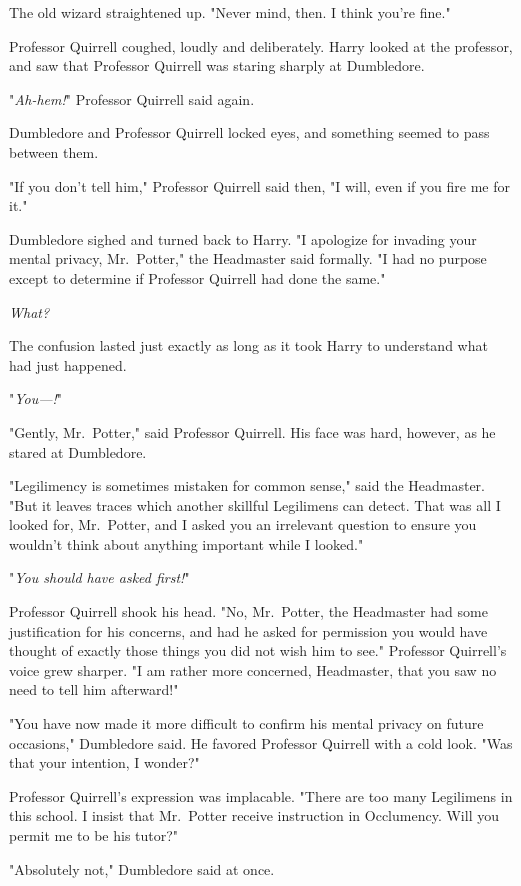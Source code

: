 The old wizard straightened up. "Never mind, then. I think you're fine."

Professor Quirrell coughed, loudly and deliberately. Harry looked at the 
professor, and saw that Professor Quirrell was staring sharply at Dumbledore.

"\emph{Ah-hem!}" Professor Quirrell said again.

Dumbledore and Professor Quirrell locked eyes, and something seemed to pass 
between them.

"If you don't tell him," Professor Quirrell said then, "I will, even if you 
fire me for it."

Dumbledore sighed and turned back to Harry. "I apologize for invading your 
mental privacy, Mr.~Potter," the Headmaster said formally. "I had no purpose 
except to determine if Professor Quirrell had done the same."

\emph{What?}

The confusion lasted just exactly as long as it took Harry to understand what 
had just happened.

"\emph{You---!}"

"Gently, Mr.~Potter," said Professor Quirrell. His face was hard, however, as 
he stared at Dumbledore.

"Legilimency is sometimes mistaken for common sense," said the Headmaster. "But 
it leaves traces which another skillful Legilimens can detect. That was all I 
looked for, Mr.~Potter, and I asked you an irrelevant question to ensure you 
wouldn't think about anything important while I looked."

"\emph{You should have asked first!}"

Professor Quirrell shook his head. "No, Mr.~Potter, the Headmaster had some 
justification for his concerns, and had he asked for permission you would have 
thought of exactly those things you did not wish him to see." Professor 
Quirrell's voice grew sharper. "I am rather more concerned, Headmaster, that 
you saw no need to tell him afterward!"

"You have now made it more difficult to confirm his mental privacy on future 
occasions," Dumbledore said. He favored Professor Quirrell with a cold look. 
"Was that your intention, I wonder?"

Professor Quirrell's expression was implacable. "There are too many Legilimens 
in this school. I insist that Mr.~Potter receive instruction in Occlumency. 
Will you permit me to be his tutor?"

"Absolutely not," Dumbledore said at once.

